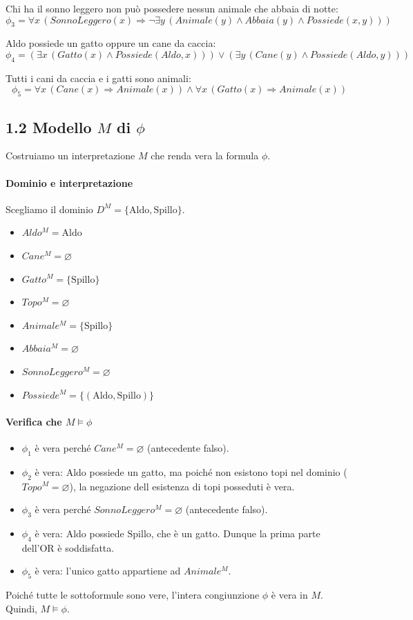 \documentclass[a4paper,11pt]{article}
\begin{document}
Chi ha il sonno leggero non può possedere nessun animale che abbaia di notte:
\[\phi_3 = \forall x \, (SonnoLeggero(x) \Rightarrow \neg \exists y \, (Animale(y) \land Abbaia(y) \land Possiede(x, y)))\]

Aldo possiede un gatto oppure un cane da caccia:
\[\phi_4 = (\exists x \, (Gatto(x) \land Possiede(Aldo, x))) \lor (\exists y \, (Cane(y) \land Possiede(Aldo, y)))\]

Tutti i cani da caccia e i gatti sono animali:
\[\phi_5 = \forall x \, (Cane(x) \Rightarrow Animale(x)) \land \forall x \, (Gatto(x) \Rightarrow Animale(x))\]


\newpage

\subsection*{1.2 Modello $M$ di $\phi$}

Costruiamo un interpretazione $M$ che renda vera la formula $\phi$.

\paragraph{Dominio e interpretazione}
Scegliamo il dominio $D^M = \{\mathrm{Aldo}, \mathrm{Spillo}\}$.
\begin{itemize}
  \item $Aldo^M = \mathrm{Aldo}$
  \item $Cane^M = \varnothing$
  \item $Gatto^M = \{\mathrm{Spillo}\}$
  \item $Topo^M = \varnothing$
  \item $Animale^M = \{\mathrm{Spillo}\}$
  \item $Abbaia^M = \varnothing$
  \item $SonnoLeggero^M = \varnothing$
  \item $Possiede^M = \{(\mathrm{Aldo}, \mathrm{Spillo})\}$
\end{itemize}

\paragraph{Verifica che $M \models \phi$}
\begin{itemize}
    \item $\phi_1$ è vera perché $Cane^M = \varnothing$ (antecedente falso).
    \item $\phi_2$ è vera: Aldo possiede un gatto, ma poiché non esistono topi nel dominio ($Topo^M = \varnothing$), la negazione dell esistenza di topi posseduti è vera.
    \item $\phi_3$ è vera perché $SonnoLeggero^M = \varnothing$ (antecedente falso).
    \item $\phi_4$ è vera: Aldo possiede $\mathrm{Spillo}$, che è un gatto. Dunque la prima parte dell'OR è soddisfatta.
    \item $\phi_5$ è vera: l'unico gatto appartiene ad $Animale^M$.
\end{itemize}
Poiché tutte le sottoformule sono vere, l'intera congiunzione $\phi$ è vera in $M$. Quindi, $M \models \phi$.
\end{document}
